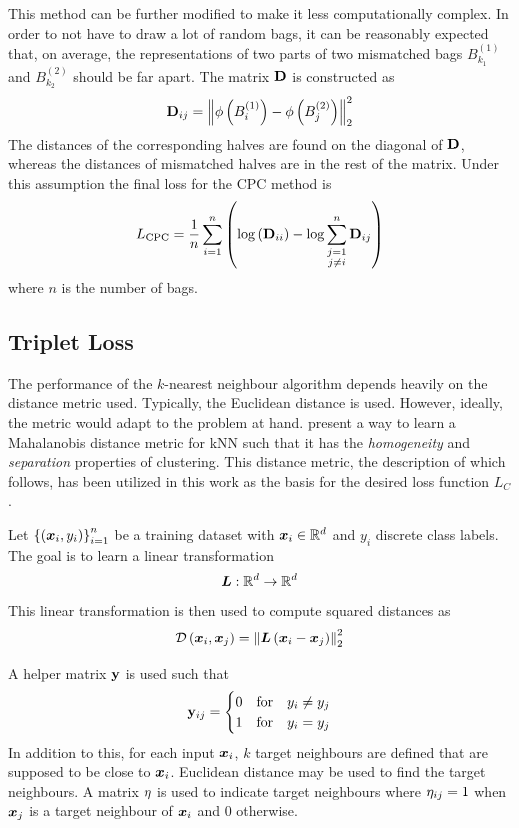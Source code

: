 This method can be further modified to make it less computationally complex. In order to not have to draw a lot of random bags, it can be reasonably expected that, on average, the representations of two parts of two mismatched bags \( B_{k_1}^{(1)} \) and \( B_{k_2}^{(2)} \) should be far apart. The matrix \( \mathbf{D} \) is constructed as
\begin{equation}\label{eq:bag-distance-matrix}
	\mathbf{D}_{ij} = \left\lVert \phi \left( B_i^{(1)} \right) - \phi \left( B_j^{(2)} \right) \right\rVert_2^2
\end{equation}
The distances of the corresponding halves are found on the diagonal of \( \mathbf{D} \), whereas the distances of mismatched halves are in the rest of the matrix. Under this assumption the final loss for the CPC method is
\[ L_\mathrm{CPC} = \frac{1}{n} \sum_{i = 1}^n \left( \log \left( \mathbf{D}_{ii} \right) - \log \sum_{\substack{j = 1 \\ j \neq i}}^n \mathbf{D}_{ij} \right) \]
where \( n \) is the number of bags.

\subsection{Triplet Loss}

The performance of the \( k \)-nearest neighbour algorithm depends heavily on the distance metric used. Typically, the Euclidean distance is used. However, ideally, the metric would adapt to the problem at hand. \cite{weinberger_distance_2006} present a way to learn a Mahalanobis distance metric for kNN such that it has the \textit{homogeneity} and \textit{separation} properties of clustering. This distance metric, the description of which follows, has been utilized in this work as the basis for the desired loss function \( L_C \).

Let \( \left\{ \left( \bm{x}_i, y_i \right) \right\}_{i = 1}^n \) be a training dataset with \( \bm{x}_i \in \mathbb{R}^d \) and \( y_i \) discrete class labels. The goal is to learn a linear transformation
\[ \bm{L} : \mathbb{R}^d \to \mathbb{R}^d \]
This linear transformation is then used to compute squared distances as
\[ \mathcal{D} \left( \bm{x}_i, \bm{x}_j \right) = \left\lVert \bm{L} \left( \bm{x}_i - \bm{x}_j \right) \right\rVert_2^2 \]

A helper matrix \( \mathbf{y} \) is used such that
\[ \mathbf{y}_{ij} = \begin{cases}
	0 &\text{for} \quad y_i \neq y_j \\
	1 &\text{for} \quad y_i = y_j \\
\end{cases} \]
In addition to this, for each input \( \bm{x}_i \), \( k \) target neighbours are defined that are supposed to be close to \( \bm{x}_i \). Euclidean distance may be used to find the target neighbours. A matrix \( \mathbf{\eta} \) is used to indicate target neighbours where \( \mathbf{\eta}_{ij} = 1 \) when \( \bm{x}_j \) is a target neighbour of \( \bm{x}_i \) and \( 0 \) otherwise.

